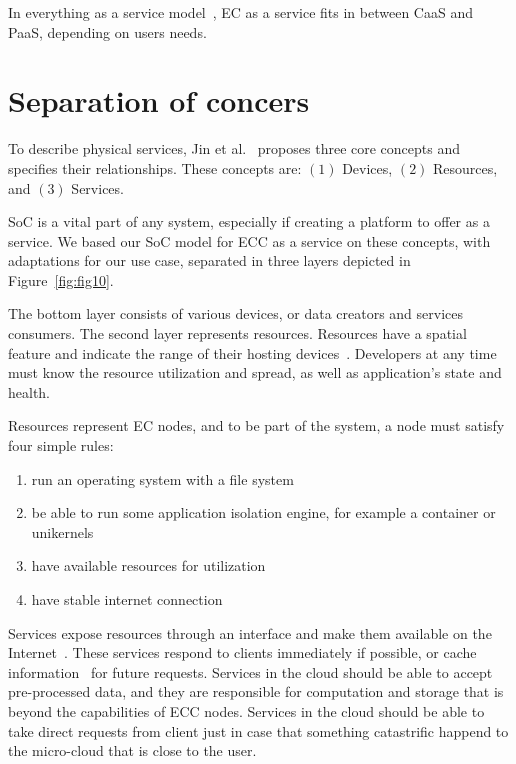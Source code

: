 In everything as a service model~\cite{DuanFZSNH15}, EC as a service fits in between CaaS and PaaS, depending on users needs. 
%
%
\section{Separation of concers}\label{sec:separation_of_concerns}
%
To describe physical services, Jin et al.~\cite{JinCJL14} proposes three core concepts and specifies their relationships. These concepts are: $(1)$ Devices, $(2)$ Resources, and $(3)$ Services. 

SoC is a vital part of any system, especially if creating a platform to offer as a service. We based our SoC model for ECC as a service on these concepts, with adaptations for our use case, separated in three layers depicted in Figure~\ref{fig:fig10}. 

The bottom layer consists of various devices, or data creators and services consumers. The second layer represents resources. Resources have a spatial feature and indicate the range of their hosting devices~\cite{JinCJL14}. Developers at any time must know the resource utilization and spread, as well as application's state and health. 

Resources represent EC nodes, and to be part of the system, a node must satisfy four simple rules:

\begin{enumerate}[start=1,label={(\bfseries \arabic*)}]
\item run an operating system with a file system 
\item be able to run some application isolation engine, for example a container or unikernels 
\item have available resources for utilization 
\item have stable internet connection
\end{enumerate}

Services expose resources through an interface and make them available on the Internet~\cite{JinCJL14}. These services respond to clients immediately if possible, or cache information~\cite{SatyanarayananBCD09,YaoXWYZP20} for future requests. Services in the cloud should be able to accept pre-processed data, and they are responsible for computation and storage that is beyond the capabilities of ECC nodes. Services in the cloud should be able to take direct requests from client just in case that something catastrific happend to the micro-cloud that is close to the user.

